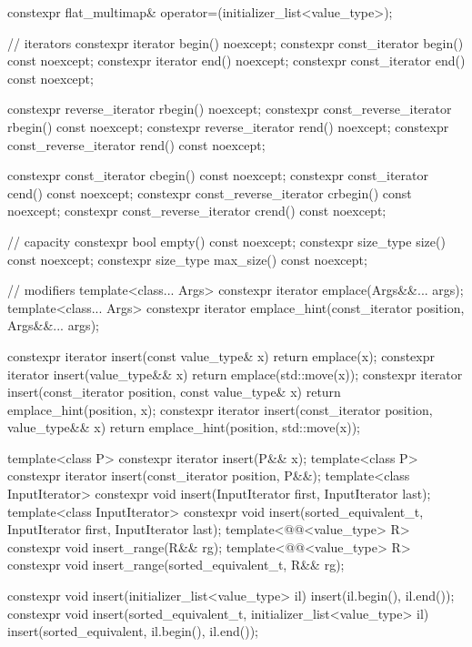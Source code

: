 \begin{codeblock}
{{    constexpr flat_multimap& operator=(initializer_list<value_type>);

    // iterators
    constexpr iterator               begin() noexcept;
    constexpr const_iterator         begin() const noexcept;
    constexpr iterator               end() noexcept;
    constexpr const_iterator         end() const noexcept;

    constexpr reverse_iterator       rbegin() noexcept;
    constexpr const_reverse_iterator rbegin() const noexcept;
    constexpr reverse_iterator       rend() noexcept;
    constexpr const_reverse_iterator rend() const noexcept;

    constexpr const_iterator         cbegin() const noexcept;
    constexpr const_iterator         cend() const noexcept;
    constexpr const_reverse_iterator crbegin() const noexcept;
    constexpr const_reverse_iterator crend() const noexcept;

    // capacity
    constexpr bool empty() const noexcept;
    constexpr size_type size() const noexcept;
    constexpr size_type max_size() const noexcept;

    // modifiers
    template<class... Args> constexpr iterator emplace(Args&&... args);
    template<class... Args>
      constexpr iterator emplace_hint(const_iterator position, Args&&... args);

    constexpr iterator insert(const value_type& x)
      { return emplace(x); }
    constexpr iterator insert(value_type&& x)
      { return emplace(std::move(x)); }
    constexpr iterator insert(const_iterator position, const value_type& x)
      { return emplace_hint(position, x); }
    constexpr iterator insert(const_iterator position, value_type&& x)
      { return emplace_hint(position, std::move(x)); }

    template<class P> constexpr iterator insert(P&& x);
    template<class P>
      constexpr iterator insert(const_iterator position, P&&);
    template<class InputIterator>
      constexpr void insert(InputIterator first, InputIterator last);
    template<class InputIterator>
      constexpr void insert(sorted_equivalent_t, InputIterator first, InputIterator last);
    template<@@<value_type> R>
      constexpr void insert_range(R&& rg);
    template<@@<value_type> R>
      constexpr void insert_range(sorted_equivalent_t, R&& rg);

    constexpr void insert(initializer_list<value_type> il)
      { insert(il.begin(), il.end()); }
    constexpr void insert(sorted_equivalent_t, initializer_list<value_type> il)
      { insert(sorted_equivalent, il.begin(), il.end()); }

}}
\end{codeblock}
